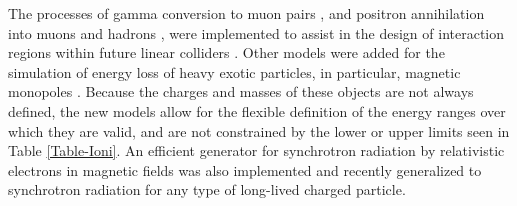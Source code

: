 The processes of gamma conversion to muon pairs \cite{embib:gmumu}, and positron
annihilation into muons and hadrons \cite{embib:emmu}, were implemented to assist
in the design of interaction regions within future linear colliders
\cite{embib:lind}.  Other models were added for the simulation of energy loss of
heavy exotic particles, in particular, magnetic monopoles \cite{embib:empbar}. 
Because the charges and masses of these objects are not always defined, the new 
models allow for the flexible definition of the energy ranges over which they
are valid, and are not constrained by the lower or upper limits seen in Table
\ref{Table-Ioni}.  An efficient generator for synchrotron radiation by 
relativistic electrons in magnetic fields was also implemented \cite{embib:syn}
and recently generalized to synchrotron radiation for any type of long-lived 
charged particle.

